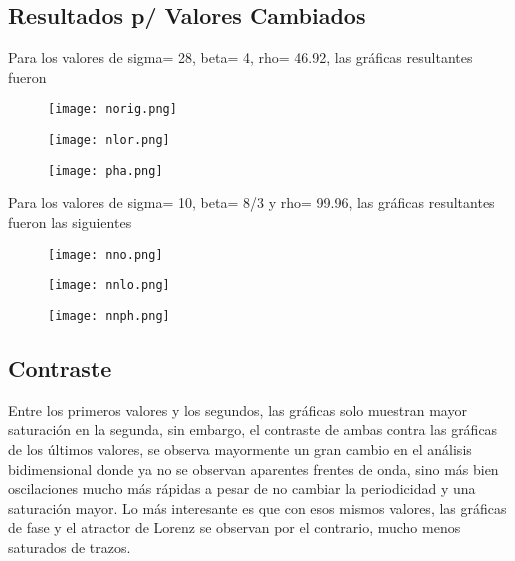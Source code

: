 \documentclass{article}
\begin{document}
\subsection{Resultados p/ Valores Cambiados}
Para los valores de sigma= 28, beta= 4, rho= 46.92, las gráficas resultantes fueron
\begin{figure}[H]
\texttt{[image: norig.png]}
\end{figure}
\begin{figure}[H]
\texttt{[image: nlor.png]}
\end{figure}
\begin{figure}[H]
\texttt{[image: pha.png]}
\end{figure}
Para los valores de sigma= 10, beta= 8/3 y rho= 99.96, las gráficas resultantes fueron las siguientes
\begin{figure}[H]
\texttt{[image: nno.png]}
\end{figure}
\begin{figure}[H]
\texttt{[image: nnlo.png]}
\end{figure}
\begin{figure}[H]
\texttt{[image: nnph.png]}
\end{figure}
\subsection{Contraste}
Entre los primeros valores y los segundos, las gráficas solo muestran mayor saturación en la segunda, sin embargo, el contraste de ambas contra las gráficas de los últimos valores, se observa mayormente un gran cambio en el análisis bidimensional donde ya no se observan aparentes frentes de onda, sino más bien oscilaciones mucho más rápidas a pesar de no cambiar la periodicidad y una saturación mayor. Lo más interesante es que con esos mismos valores, las gráficas de fase y el atractor de Lorenz se observan por el contrario, mucho menos saturados de trazos.
\end{document}
